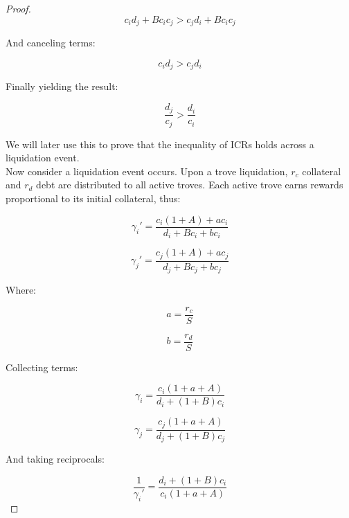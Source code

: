 \documentclass[reqno]{article}
\begin{document}
\begin{proof}
\begin{equation} 
    c_id_j+Bc_ic_j > c_jd_i+Bc_ic_j
\end{equation}

\bigskip
And canceling terms:

\begin{equation}
    c_id_j > c_jd_i
\end{equation}

\bigskip
Finally yielding the result:

\begin{equation} \label{eq:217}
    \frac{d_j}{c_j}>\frac{d_i}{c_i}
\end{equation}

\bigskip
We will later use this to prove that the inequality of ICRs holds across a liquidation event.\\

Now consider a liquidation event occurs. Upon a trove liquidation, $r_c$ collateral and $r_d$ debt are distributed to all active troves. Each active trove earns rewards proportional to its initial collateral, thus:

\begin{equation} 
    \gamma_{i}'=\frac{c_i\left(1+A\right)+ac_i}{d_i+Bc_i+bc_i}
\end{equation}

\begin{equation} 
    \gamma_{j}'=\frac{c_j\left(1+A\right)+ac_j}{d_j+Bc_j+bc_j}
\end{equation}

\bigskip
Where:

\begin{equation} 
    a=\frac{r_c}{S}
\end{equation}

\begin{equation} 
    b=\frac{r_d}{S}
\end{equation}

\bigskip
Collecting terms:

\begin{equation} 
    \gamma_i=\frac{c_i\left(1+a+A\right)}{d_i+\left(1+B\right)c_i}
\end{equation}

\begin{equation} 
    \gamma_j=\frac{c_j\left(1+a+A\right)}{d_j+\left(1+B\right)c_j}
\end{equation}

\bigskip
And taking reciprocals:

\begin{equation} 
    \frac{1}{\gamma_{i}'}=\frac{d_i+\left(1+B\right)c_i}{c_i\left(1+a+A\right)}
\end{equation}


\end{proof}
\end{document}

